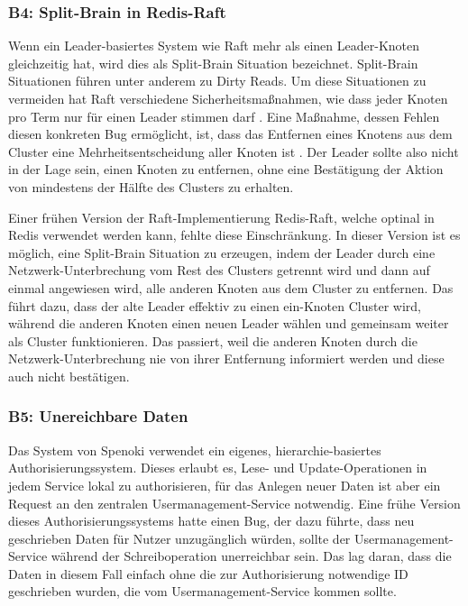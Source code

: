 \documentclass[12pt,a4paper]{report}
\begin{document}
\subsubsection{B4: Split-Brain in Redis-Raft}
Wenn ein Leader-basiertes System wie Raft mehr als einen Leader-Knoten gleichzeitig hat, wird dies als Split-Brain Situation
bezeichnet. Split-Brain Situationen führen unter anderem zu Dirty Reads. Um diese Situationen zu vermeiden hat Raft verschiedene
Sicherheitsmaßnahmen, wie dass jeder Knoten pro Term nur für einen Leader stimmen darf \cite{raft_original_paper}. Eine Maßnahme,
dessen Fehlen diesen konkreten Bug ermöglicht, ist, dass das Entfernen eines Knotens aus dem Cluster eine Mehrheitsentscheidung
aller Knoten ist \cite{jepsen_redis_raft}. Der Leader sollte also nicht in der Lage sein, einen Knoten zu entfernen, ohne eine
Bestätigung der Aktion von mindestens der Hälfte des Clusters zu erhalten.

Einer frühen Version der Raft-Implementierung Redis-Raft, welche optinal in Redis verwendet werden kann, fehlte diese
Einschränkung. In dieser Version ist es möglich, eine Split-Brain Situation zu erzeugen, indem der Leader durch eine
Netzwerk-Unterbrechung vom Rest des Clusters getrennt wird und dann auf einmal angewiesen wird, alle anderen Knoten aus dem
Cluster zu entfernen. Das führt dazu, dass der alte Leader effektiv zu einen ein-Knoten Cluster wird, während die anderen Knoten
einen neuen Leader wählen und gemeinsam weiter als Cluster funktionieren. Das passiert, weil die anderen Knoten durch die
Netzwerk-Unterbrechung nie von ihrer Entfernung informiert werden und diese auch nicht bestätigen. \cite{jepsen_redis_raft}

\subsubsection{B5: Unereichbare Daten}
Das System von Spenoki verwendet ein eigenes, hierarchie-basiertes Authorisierungssystem. Dieses erlaubt es, Lese- und
Update-Operationen in jedem Service lokal zu authorisieren, für das Anlegen neuer Daten ist aber ein Request an den zentralen
Usermanagement-Service notwendig. Eine frühe Version dieses Authorisierungssystems hatte einen Bug, der dazu führte, dass neu
geschrieben Daten für Nutzer unzugänglich würden, sollte der Usermanagement-Service während der Schreiboperation unerreichbar
sein. Das lag daran, dass die Daten in diesem Fall einfach ohne die zur Authorisierung notwendige ID geschrieben wurden, die vom
Usermanagement-Service kommen sollte.
\end{document}
